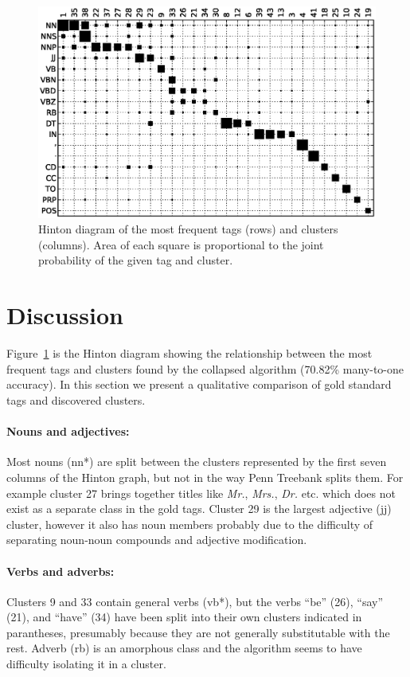 \documentclass[11pt]{article}
\newcommand{\collapseResult}{70.82}
\begin{document}
\begin{figure}[t]
\includegraphics[width=\textwidth]{hinton.eps}
\vspace*{-10mm}
\caption{Hinton diagram of the most frequent tags (rows) and clusters
  (columns).  Area of each square is proportional to the joint
  probability of the given tag and cluster.}
\label{fig:hinton}
\end{figure}

\section{Discussion}
\label{sec:discussion}

Figure~\ref{fig:hinton} is the Hinton diagram showing the relationship
between the most frequent tags and clusters found by the collapsed
algorithm (\collapseResult\% many-to-one accuracy).  In this section
we present a qualitative comparison of gold standard tags and
discovered clusters.

\paragraph{Nouns and adjectives:} Most nouns ({\sc nn*}) are split between the
clusters represented by the first seven columns of the Hinton graph,
but not in the way Penn Treebank splits them.  For example cluster 27
brings together titles like {\em Mr.}, {\em Mrs.}, {\em Dr.}
etc. which does not exist as a separate class in the gold tags.
Cluster 29 is the largest adjective ({\sc jj}) cluster, however it
also has noun members probably due to the difficulty of separating
noun-noun compounds and adjective modification.

\paragraph{Verbs and adverbs:}  Clusters 9 and 33 contain general
verbs ({\sc vb*}), but the verbs ``be'' (26), ``say'' (21), and
``have'' (34) have been split into their own clusters indicated in
parantheses, presumably because they are not generally substitutable
with the rest.  Adverb ({\sc rb}) is an amorphous class and the
algorithm seems to have difficulty isolating it in a cluster.
\end{document}
